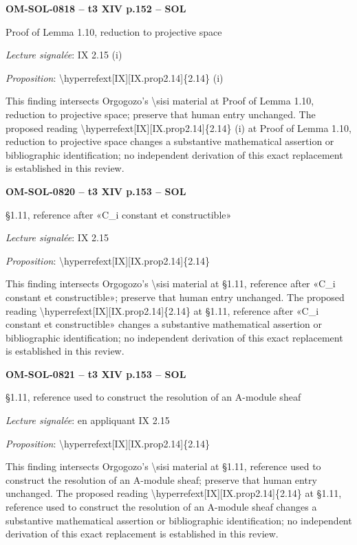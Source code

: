 \par\noindent\textbf{OM-SOL-0818 -- t3 XIV p.152 -- SOL}\par
Proof of Lemma 1.10, reduction to projective space\par
\emph{Lecture signalée}: IX 2.15 (i)\par
\emph{Proposition}: \textbackslash{}hyperrefext[IX][IX.prop2.14]\{2.14\} (i)\par
This finding intersects Orgogozo's \textbackslash{}sisi material at Proof of Lemma 1.10, reduction to projective space; preserve that human entry unchanged. The proposed reading \textbackslash{}hyperrefext[IX][IX.prop2.14]\{2.14\} (i) at Proof of Lemma 1.10, reduction to projective space changes a substantive mathematical assertion or bibliographic identification; no independent derivation of this exact replacement is established in this review.\par
\par\noindent\textbf{OM-SOL-0820 -- t3 XIV p.153 -- SOL}\par
§1.11, reference after «C\_i constant et constructible»\par
\emph{Lecture signalée}: IX 2.15\par
\emph{Proposition}: \textbackslash{}hyperrefext[IX][IX.prop2.14]\{2.14\}\par
This finding intersects Orgogozo's \textbackslash{}sisi material at §1.11, reference after «C\_i constant et constructible»; preserve that human entry unchanged. The proposed reading \textbackslash{}hyperrefext[IX][IX.prop2.14]\{2.14\} at §1.11, reference after «C\_i constant et constructible» changes a substantive mathematical assertion or bibliographic identification; no independent derivation of this exact replacement is established in this review.\par
\par\noindent\textbf{OM-SOL-0821 -- t3 XIV p.153 -- SOL}\par
§1.11, reference used to construct the resolution of an A-module sheaf\par
\emph{Lecture signalée}: en appliquant IX 2.15\par
\emph{Proposition}: \textbackslash{}hyperrefext[IX][IX.prop2.14]\{2.14\}\par
This finding intersects Orgogozo's \textbackslash{}sisi material at §1.11, reference used to construct the resolution of an A-module sheaf; preserve that human entry unchanged. The proposed reading \textbackslash{}hyperrefext[IX][IX.prop2.14]\{2.14\} at §1.11, reference used to construct the resolution of an A-module sheaf changes a substantive mathematical assertion or bibliographic identification; no independent derivation of this exact replacement is established in this review.\par
